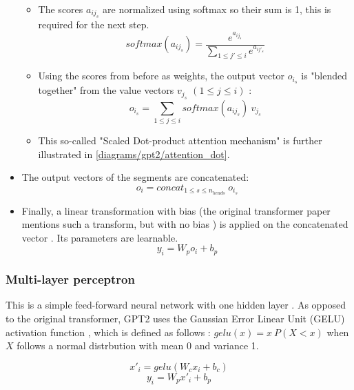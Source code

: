 \begin{itemize}
\begin{samepage}
\begin{itemize}
\item The scores $a_{ij_s}$ are normalized using softmax so their sum is 1, this is required for the next step.
   $$ softmax(a_{ij_s}) = \frac {e^{a_{ij_s}}} {\sum_{1 \leq j' \leq i} {e^{a_{ij'_s}}}} $$


\item Using the scores from before as weights, the output vector $o_{i_s}$ is "blended together" from the value vectors $v_{j_s}$ $(1 \leq j \leq i)$ \cite{alammar-gpt2}:
    $$o_{i_s} = \sum _{1 \leq j \leq i} softmax(a_{ij_s}) \ v_{j_s}$$

\item This so-called "Scaled Dot-product attention mechanism" is further illustrated in \cref{diagrams/gpt2/attention_dot}.

\end{itemize}
\end{samepage}


\item The output vectors of the segments are concatenated:
   $$o_i = concat _{1 \leq s \leq n_{heads}} \ o_{i_s}$$



\item Finally, a linear transformation with bias (the original transformer paper mentions such a transform, but with no bias ) is applied on the concatenated vector \cite{alammar-gpt2}. Its parameters are learnable.
   $$y_i = W_p o_i + b_p$$

\end{itemize}

\subsubsection{Multi-layer perceptron}
\label{gpt2:mlp}


This is a simple feed-forward neural network with one hidden layer .
As opposed to the original transformer, GPT2 uses the Gaussian Error Linear Unit (GELU) activation function , which is defined as follows \cite{gelu}: $gelu(x) = x \ P(X<x)$ when $X$ follows a normal distrbution with mean 0 and variance 1.

$$x'_i = gelu(W_c x_i + b_c)$$
$$y_i = W_p x'_i + b_p$$

